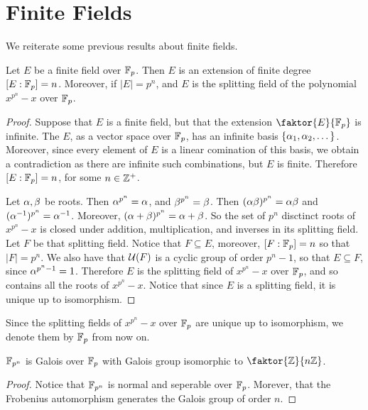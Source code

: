 \section{Finite Fields}

We reiterate some previous results about finite fields.

\begin{proposition}\label{2.3.1}
    Let $E$ be a finite field over  $\mathbb{F}_p$. Then $E$ is an extension of finite
    degree $[E:\mathbb{F}_p]=n$. Moreover, if $|E|=p^n$, and $E$ is the splitting field
    of the polynomial $x^{p^n}-x$ over $\mathbb{F}_p$.
\end{proposition}

\begin{proof}
    Suppose that $E$ is a finite field, but that the extension
    $\faktor{E}{\F_p}$ is infinite. The $E$, as a vector space over  $\mathbb{F}_p$, has
    an infinite basis  $\{\alpha_1, \alpha_2, \dots\}$. Moreover, since every element of
    $E$ is a linear comination of this basis, we obtain a contradiction as there
    are infinite such combinations, but $E$ is finite. Therefore $[E:\mathbb{F}_p]=n$,
    for some $n \in \mathbb{Z}^+$.

    Let $\alpha,\beta$ be roots. Then  $\alpha^{p^n}=\alpha$, and $\beta^{p^n}=\beta$. Then
    $(\alpha\beta)^{p^n}=\alpha\beta$ and $(\alpha^{-1})^{p^n}=\alpha^{-1}$. Moreover,
    $(\alpha+\beta)^{p^n}=\alpha+\beta$. So the set of $p^n$ disctinct roots of  $x^{p^n}-x$
    is closed under addition, multiplication, and inverses in its splitting
    field. Let $F$ be that splitting field. Notice that  $F \subseteq E$,
    moreover, $[F:\mathbb{F}_p]=n$ so that $|F|=p^n$. We also have that
    $\mathcal{U}(F)$ is a cyclic group of order $p^n-1$, so that $E \subseteq F$,
    since $\alpha^{p^n-1}=1$. Therefore $E$ is the splitting field of
    $x^{p^n}-x$ over $\mathbb{F}_p$, and so contains all the roots of $x^{p^n}-x$.
    Notice that since $E$ is a splitting field, it is unique up to isomorphism.
\end{proof}
\begin{remark}
    Since the splitting fields of $x^{p^n}-x$ over $\mathbb{F}_p$ are unique up to
    isomorphism, we denote them by  $\mathbb{F}_p$ from now on.
\end{remark}
\begin{corollary}
    $\mathbb{F}_{p^n}$ is Galois over $\mathbb{F}_p$ with Galois group isomorphic to
    $\faktor{\Z}{n\Z}$.
\end{corollary}
\begin{proof}
    Notice that $\mathbb{F}_{p^n}$ is normal and seperable over $\mathbb{F}_p$. Morever, that
    the Frobenius automorphism generates the Galois group of order  $n$.
\end{proof}
